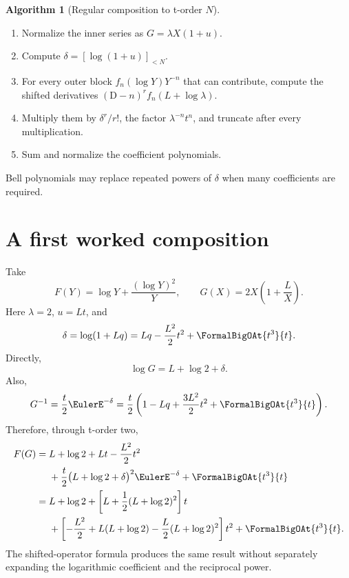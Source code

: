 \documentclass[11pt,openany]{book}
\theoremstyle{definition}
\newtheorem{algorithm}{Algorithm}[chapter]
\theoremstyle{plain}
\theoremstyle{remark}
\newcommand{\Dop}{\mathrm{D}}
\begin{document}
\begin{algorithm}[Regular composition to t-order \(N\)]\label{alg:regular-composition}
\leavevmode
\begin{enumerate}
\item Normalize the inner series as \(G=\lambda X(1+u)\).
\item Compute \(\delta=[\log(1+u)]_{<N}\).
\item For every outer block \(f_n(\log Y)Y^{-n}\) that can contribute, compute
      the shifted derivatives \((\Dop-n)^rf_n(L+\log\lambda)\).
\item Multiply them by \(\delta^r/r!\), the factor
      \(\lambda^{-n}t^n\), and truncate after every multiplication.
\item Sum and normalize the coefficient polynomials.
\end{enumerate}
Bell polynomials may replace repeated powers of \(\delta\) when many
coefficients are required.
\end{algorithm}

\section{A first worked composition}
Take
\[
 F(Y)=\log Y+\frac{(\log Y)^2}{Y},
 \qquad
 G(X)=2X\left(1+\frac{L}{X}\right).
\]
Here \(\lambda=2\), \(u=Lt\), and
\[
 \delta=\log(1+Lq)=Lq-\frac{L^2}{2}t^2+\FormalBigOAt{t^3}{t}.
\]
Directly,
\[
 \log G=L+\log2+\delta.
\]
Also,
\[
 G^{-1}=\frac{t}{2}\EulerE^{-\delta}
 =\frac t2\left(1-Lq+\frac{3L^2}{2}t^2+\FormalBigOAt{t^3}{t}\right).
\]
Therefore, through t-order two,
\begin{align*}
 F(G)
={}&L+\log2+Lt-\frac{L^2}{2}t^2\\
&+\frac t2\bigl(L+\log2+\delta\bigr)^2\EulerE^{-\delta}
 +\FormalBigOAt{t^3}{t}\\
={}&L+\log2
 +\left[L+\frac12(L+\log2)^2\right]t\\
&+\left[-\frac{L^2}{2}
 +L(L+\log2)-\frac L2(L+\log2)^2\right]t^2
 +\FormalBigOAt{t^3}{t}.
\end{align*}
The shifted-operator formula produces the same result without separately
expanding the logarithmic coefficient and the reciprocal power.
\end{document}
